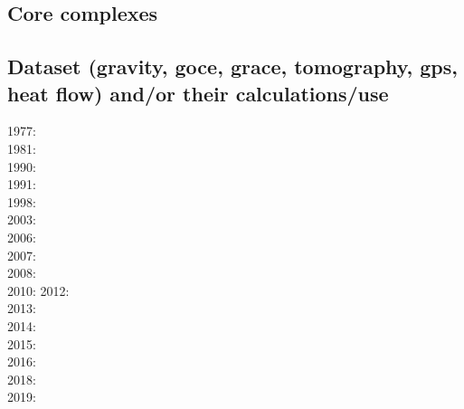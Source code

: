 {\scriptsize
\cite{elbj98}
\cite{elbe99}
\cite{sobb05}
\cite{sckb09}
\cite{scpo13}
}

\subsection{Core complexes}

{\scriptsize
\noindent
\cite{gewm07}
\cite{tibb08}
\cite{tigv09}
\cite{lehm12}\cite{scgb12}
\cite{pebu15}
\cite{brst18}
}

\subsection{Dataset (gravity, goce, grace, tomography, gps, heat flow) 
and/or their calculations/use}

\noindent
{\scriptsize
1977: \cite{rola77}\\
1981: \cite{dzan81}\\
1990: \cite{lips90}\\
1991: \cite{spak91}\\
1998: \cite{bisp98}\\
2003: \cite{krhh03}\cite{sosi03}\cite{pimo03}\\
2006: \cite{masr06}\\
2007: \cite{mitk07}\cite{lobc07}\cite{rimb07}\\
2008: \cite{zhou08}\cite{zhou08}\\
2010: \cite{dada10}
2012: \cite{hawj12}\cite{resa12}\cite{hawj12}\cite{fesw12}\\
2013: \cite{ress13}\cite{ebbf13}\cite{davi13}\\
2014: \cite{paml14}\cite{ebbf14}\cite{krbk14}\\
2015: \cite{boem15}\cite{brrs15}\\
2016: \cite{kord16}\cite{moek16}\\
2018: \cite{pabn18}\cite{hamp18}\\
2019: \cite{sopg19}
}

